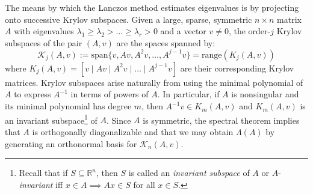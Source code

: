 \documentclass[10pt]{article}
\numberwithin{equation}{section}
\newcommand{\+}{%
	\raisebox{0.18ex}{\scaleobj{0.55}{+}}
}
\theoremstyle{definition}
\theoremstyle{definition}
\begin{document}
 
The means by which the Lanczos method estimates eigenvalues is by projecting onto successive Krylov subspaces. Given a large, sparse, symmetric $n \times n$ matrix $A$ with eigenvalues $\lambda_1 \geq \lambda_2 > \dots \geq \lambda_r > 0$ and a vector $v \neq 0$, the order-$j$ Krylov subspaces of the pair $(A, v)$ are the spaces spanned by: 
\begin{equation}
	\mathcal{K}_j(A, v) := \mathrm{span}\{ v, Av, A^2 v, \dots, A^{j-1}v \} = \mathrm{range}(K_j(A, v))
\end{equation}
where $K_j(A, v) = [ v \mid Av \mid A^2 v \mid \dots \mid A^{j-1}v]$ are their corresponding Krylov matrices. 
Krylov subspaces arise naturally from using the minimal polynomial of $A$ to express $A^{-1}$ in terms of powers of $A$. In particular, if $A$ is nonsingular and its minimal polynomial has degree $m$, then $A^{-1}v \in K_m(A, v)$ and $K_m(A, v)$ is an invariant subspace\footnote{Recall that if $S \subseteq \mathbb{R}^n$, then $S$ is called an \emph{invariant subspace} of $A$ or $A$-\emph{invariant} iff $x \in A \implies Ax \in S$ for all $x \in S$.} of $A$.
Since $A$ is symmetric, the spectral theorem implies that $A$ is orthogonally diagonalizable and that we may obtain $\Lambda(A)$ by generating an orthonormal basis for $\mathcal{K}_n(A, v)$. 
\end{document}
